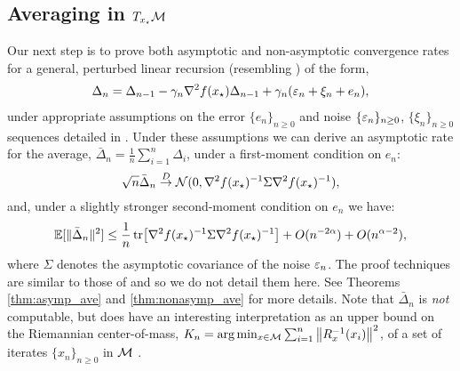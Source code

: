 \subsection{Averaging in $T_{x_\star} \mathcal{M}$} \label{sec:pfsketch2}
\vspace{-.0856cm}
Our next step is to prove both asymptotic and non-asymptotic convergence rates for a general, perturbed linear recursion (resembling ) of the form,
\begin{align}
  \Delta_{n}=\Delta_{n-1} -\gamma_n \nabla^2 f(x_\star) \Delta_{n-1}+ \gamma_n (\varepsilon_n+\xi_{n}+e_{n}),\label{eq:rec_with_error}
\end{align}
under appropriate assumptions on the error $\{ e_n \}_{n \geq 0}$ and noise $\{ \varepsilon_n \}_{n \geq 0}$, $\{ \xi_n \}_{n \geq 0}$ sequences detailed in . Under these assumptions we can derive an asymptotic rate for the average, $\bar{\Delta}_n = \frac{1}{n}\sum_{i=1}^{n} \Delta_i$, under a first-moment condition on $e_n$:
  \[
  \sqrt n \bar{\Delta}_n  \overset{D}{\to} \mathcal N (0,  \nabla^2 f(x_\star)^{-1}\Sigma \nabla^2 f(x_\star)^{-1}),
  \]
  and, under a slightly stronger second-moment condition on $e_n$ we have:
  \[
    \mathbb{E}[\Vert \bar{\Delta}_n \Vert ^2] \leq \frac{1}{n} \tr [\nabla^2 f(x_\star)^{-1} \Sigma \nabla^2 f(x_\star)^{-1}] +  O(n^{-2\alpha}) + O(n^{\alpha-2}),
  \]
  where $\Sigma$ denotes the asymptotic covariance of the noise $\varepsilon_n$. The proof techniques are similar to those of \citet{polyak1992acceleration} and \citet{moulines2011non} so we do not detail them here. See Theorems \ref{thm:asymp_ave} and \ref{thm:nonasymp_ave} for more details.
  Note that $\bar{\Delta}_n$ is \textit{not} computable, but does have an interesting interpretation as an upper bound on the Riemannian center-of-mass, $K_n = \arg \min_{x \in \mathcal{M}}\sum_{i=1}^{n} \norm{R_{x}^{-1}(x_i)}^2$, of a set of iterates $\{ x_n \}_{n \geq 0}$ in $\mathcal{M}$
   \citep[see  and][for more details]{Afs11}.
\vspace{-3.11pt}
